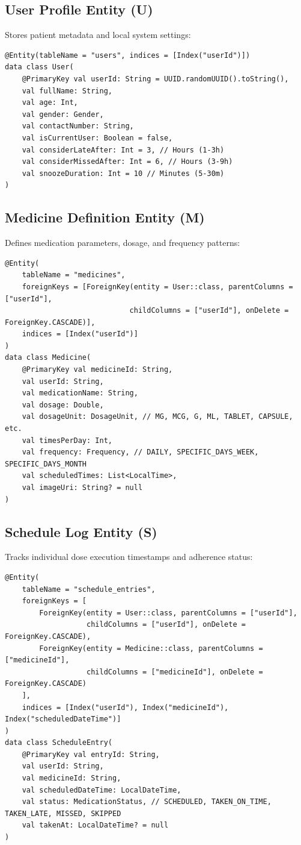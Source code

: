 \documentclass[10pt]{article}
\begin{document}
\subsection{User Profile Entity (U)}
Stores patient metadata and local system settings:
\begin{verbatim}
@Entity(tableName = "users", indices = [Index("userId")])
data class User(
    @PrimaryKey val userId: String = UUID.randomUUID().toString(),
    val fullName: String,
    val age: Int,
    val gender: Gender,
    val contactNumber: String,
    val isCurrentUser: Boolean = false,
    val considerLateAfter: Int = 3, // Hours (1-3h)
    val considerMissedAfter: Int = 6, // Hours (3-9h)
    val snoozeDuration: Int = 10 // Minutes (5-30m)
)
\end{verbatim}

\subsection{Medicine Definition Entity (M)}
Defines medication parameters, dosage, and frequency patterns:
\begin{verbatim}
@Entity(
    tableName = "medicines",
    foreignKeys = [ForeignKey(entity = User::class, parentColumns = ["userId"],
                             childColumns = ["userId"], onDelete = ForeignKey.CASCADE)],
    indices = [Index("userId")]
)
data class Medicine(
    @PrimaryKey val medicineId: String,
    val userId: String,
    val medicationName: String,
    val dosage: Double,
    val dosageUnit: DosageUnit, // MG, MCG, G, ML, TABLET, CAPSULE, etc.
    val timesPerDay: Int,
    val frequency: Frequency, // DAILY, SPECIFIC_DAYS_WEEK, SPECIFIC_DAYS_MONTH
    val scheduledTimes: List<LocalTime>,
    val imageUri: String? = null
)
\end{verbatim}

\subsection{Schedule Log Entity (S)}
Tracks individual dose execution timestamps and adherence status:
\begin{verbatim}
@Entity(
    tableName = "schedule_entries",
    foreignKeys = [
        ForeignKey(entity = User::class, parentColumns = ["userId"],
                   childColumns = ["userId"], onDelete = ForeignKey.CASCADE),
        ForeignKey(entity = Medicine::class, parentColumns = ["medicineId"],
                   childColumns = ["medicineId"], onDelete = ForeignKey.CASCADE)
    ],
    indices = [Index("userId"), Index("medicineId"), Index("scheduledDateTime")]
)
data class ScheduleEntry(
    @PrimaryKey val entryId: String,
    val userId: String,
    val medicineId: String,
    val scheduledDateTime: LocalDateTime,
    val status: MedicationStatus, // SCHEDULED, TAKEN_ON_TIME, TAKEN_LATE, MISSED, SKIPPED
    val takenAt: LocalDateTime? = null
)
\end{verbatim}
\end{document}
